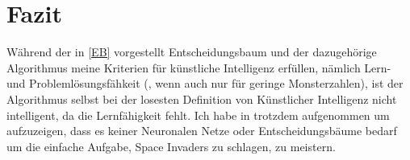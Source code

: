 \section{Fazit}
Während der in \ref{EB} vorgestellt Entscheidungsbaum und der dazugehörige Algorithmus  meine Kriterien für künstliche Intelligenz erfüllen, nämlich Lern- und Problemlösungsfähkeit (, wenn auch nur für geringe Monsterzahlen), ist der Algorithmus selbst bei der losesten Definition von Künstlicher Intelligenz nicht intelligent, da die Lernfähigkeit fehlt. Ich habe in trotzdem aufgenommen um aufzuzeigen, dass es keiner Neuronalen Netze oder Entscheidungsbäume bedarf um die einfache Aufgabe, Space Invaders zu schlagen, zu meistern. 
		